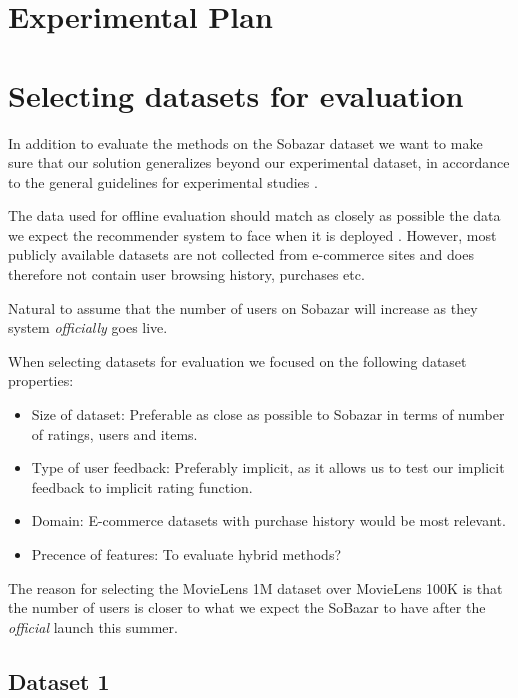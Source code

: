 \section{Experimental Plan}



\section{Selecting datasets for evaluation}

In addition to evaluate the methods on the Sobazar dataset we want to make sure that our solution generalizes beyond our experimental dataset, in accordance to the general guidelines for experimental studies \cite{Shani2011}.

The data used for offline evaluation should match as closely as possible the data we expect the recommender system to face when it is deployed \cite{Gunawardana2009}. However, most publicly available datasets are not collected from e-commerce sites and does therefore not contain user browsing history, purchases etc.


Natural to assume that the number of users on Sobazar will increase as they system \emph{officially} goes live.





When selecting datasets for evaluation we focused on the following dataset properties:


\begin{itemize}
\item Size of dataset: Preferable as close as possible to Sobazar in terms of number of ratings, users and items.
\item Type of user feedback: Preferably implicit, as it allows us to test our implicit feedback to implicit rating function.
\item Domain: E-commerce datasets with purchase history would be most relevant.
\item Precence of features: To evaluate hybrid methods?
\end{itemize}


The reason for selecting the MovieLens 1M dataset over MovieLens 100K is that the number of users is closer to what we expect the SoBazar to have after the \emph{official} launch this summer. 


\subsection{Dataset 1}

